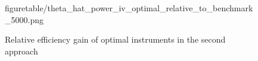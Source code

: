 \documentclass[11pt, a4paper]{article}
\begin{document}
\begin{figure}[!ht]
\begin{center}
{  {figuretable/theta_hat_power_iv_optimal_relative_to_benchmark_5000.png}}
  \caption{Relative efficiency gain of optimal instruments in the second approach}
  \label{fg:theta_hat_power_iv_optimal_relative_to_benchmark_10000}
  \end{center}
\end{figure} 











\end{document}
